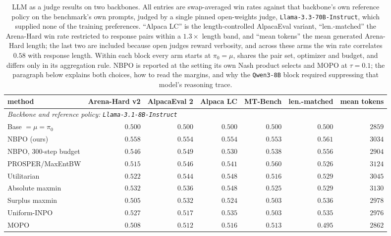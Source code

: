 \documentclass{article}
\theoremstyle{remark}
\theoremstyle{plain}
\newcommand{\NBPO}{\textsc{NBPO}}
\begin{document}
\begin{table}[t]
\centering\scriptsize
\setlength{\tabcolsep}{2.2pt}
\caption{LLM as a judge results on two backbones. All entries are swap-averaged win rates against that
backbone's own reference policy on the benchmark's own prompts, judged by a single pinned open-weights
judge, \texttt{Llama-3.3-70B-Instruct}, which supplied none of the training preferences. ``Alpaca LC'' is the length-controlled
AlpacaEval variant, ``len.-matched'' the Arena-Hard win rate restricted to response pairs within a
$1.3\times$ length band, and ``mean tokens'' the mean generated Arena-Hard length; the last two are
included because open judges reward verbosity, and across these arms the win rate correlates $0.58$ with
response length. Within each block every arm starts at $\pi_0=\mu$, shares the pair set, optimizer and
budget, and differs only in its aggregation rule. \NBPO{} is reported at the setting its own Nash product
selects and MOPO at $\tau{=}0.1$; the paragraph below explains both choices, how to read the margins, and
why the \texttt{Qwen3-8B} block required suppressing that model's reasoning trace.}
\label{tab:general-benchmark-completion}
\begin{tabular}{lrrrrrr}
\toprule
method & Arena-Hard v2 & AlpacaEval 2 & Alpaca LC & MT-Bench & len.-matched & mean tokens \\
\midrule
\multicolumn{7}{l}{\textit{Backbone and reference policy: \texttt{Llama-3.1-8B-Instruct}}}\\
Base $=\mu=\pi_0$ & $0.500$ & $0.500$ & $0.500$ & $0.500$ & $0.500$ & $2859$ \\
\NBPO{} (ours) & $\mathbf{0.558}$ & $\mathbf{0.554}$ & $\mathbf{0.554}$ & $0.553$ & $\mathbf{0.561}$ & $3034$ \\
\NBPO{}, 300-step budget & $0.546$ & $0.549$ & $0.530$ & $0.538$ & $0.556$ & $2904$ \\
PROSPER/MaxEntBW & $0.515$ & $0.546$ & $0.541$ & $\mathbf{0.560}$ & $0.526$ & $3124$ \\
Utilitarian & $0.522$ & $0.544$ & $0.548$ & $0.516$ & $0.529$ & $3045$ \\
Absolute maxmin & $0.532$ & $0.536$ & $0.548$ & $0.525$ & $0.529$ & $3130$ \\
Surplus maxmin & $0.505$ & $0.532$ & $0.524$ & $0.503$ & $0.536$ & $2978$ \\
Uniform-INPO & $0.527$ & $0.517$ & $0.535$ & $0.503$ & $0.535$ & $2976$ \\
MOPO & $0.508$ & $0.512$ & $0.516$ & $0.513$ & $0.495$ & $2862$ \\

\end{tabular}
\end{table}
\end{document}
